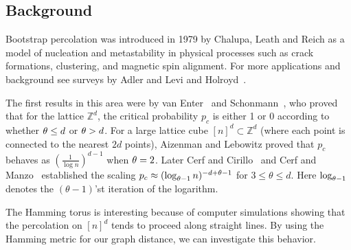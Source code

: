 \subsection{Background}
Bootstrap percolation was introduced in 1979 by Chalupa, Leath and Reich \cite{bethe} as a model of nucleation and metastability in physical processes such as crack formations, clustering, and magnetic spin alignment.
For more applications and background see surveys by Adler and Levi \cite{brazil} and Holroyd~\cite{holroyd-survey}.

The first results in this area were by van Enter~\cite{vanenter} and Schonmann~\cite{schonmann}, who proved that for the lattice $\mathbb{Z}^d$, the critical probability $p_c$ is either 1 or 0 according to whether $\theta \le d$ or $\theta > d$. 
For a large lattice cube $[n]^d\subset \mathbb{Z}^d$ (where each point is connected to the nearest $2d$ points), Aizenman and Lebowitz \cite{aizenman} proved that $p_c$ behaves as $(\frac{1}{\log n})^{d-1}$ when $\theta=2$.
Later Cerf and Cirillo~\cite{cerfcirillo} and Cerf and Manzo~\cite{cerfmanzo} established the scaling $p_c \approx (\log_{\theta-1} n)^{-d+\theta-1}$ for $3\le \theta\le d$.
Here $\log_{\theta-1}$ denotes the $(\theta-1)$'st iteration of the logarithm. 

The Hamming torus is interesting because of computer simulations showing that the percolation on $[n]^d$ tends to proceed along straight lines.
By using the Hamming metric for our graph distance, we can investigate this behavior.

